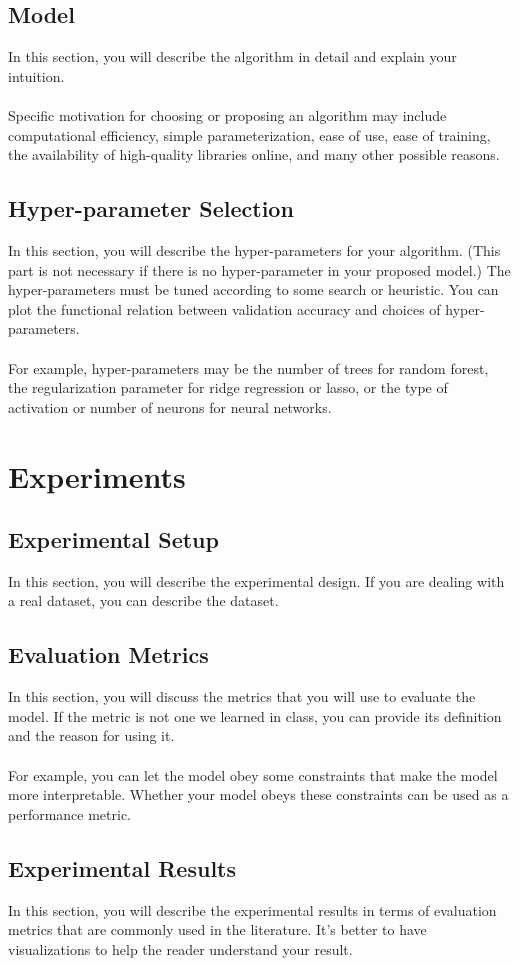 \documentclass[12pt]{article}
\theoremstyle{definition}
\begin{document}
\subsection{Model}
In this section, you will describe the algorithm in detail and explain your intuition. \\
~\\
Specific motivation for choosing or proposing an algorithm may include computational efficiency, simple parameterization, ease of use, ease of training, the availability of high-quality libraries online, and many other possible reasons.
\subsection{Hyper-parameter Selection}
In this section, you will describe the hyper-parameters for your algorithm. (This part is not necessary if there is no hyper-parameter in your proposed model.) The hyper-parameters must be tuned according to some search or heuristic. You can plot the functional relation between validation accuracy and choices of hyper-parameters. \\
~\\
For example, hyper-parameters may be the number of trees for random forest, the regularization parameter for ridge regression or lasso, or the type of activation or number of neurons for neural networks.
\section{Experiments}
\subsection{Experimental Setup}
In this section, you will describe the experimental design. If you are dealing with a real dataset, you can describe the dataset.
\subsection{Evaluation Metrics}
In this section, you will discuss the metrics that you will use to evaluate the model. If the metric is not one we learned in class, you can provide its definition and the reason for using it.\\
~\\
For example, you can let the model obey some constraints that make the model more interpretable. Whether your model obeys these constraints can be used as a performance metric.
\subsection{Experimental Results}
In this section, you will describe the experimental results in terms of evaluation metrics that are commonly used in the literature. It's better to have visualizations to help the reader understand your result. 
\end{document}
